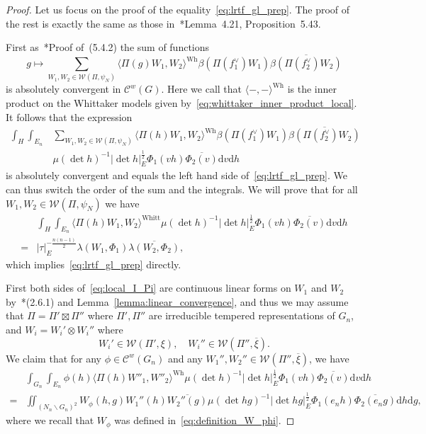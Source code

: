 \documentclass[letterpaper,11pt]{amsart}
\newcommand{\cC}{\mathcal{C}}
\newcommand{\cW}{\mathcal{W}}
\newcommand{\rd}{\mathrm{d}}
\newcommand{\bs}{\backslash}
\newcommand{\<}{\negthickspace}
\providecommand{\abs}[1]{\lvert#1\rvert}
\theoremstyle{definition}
\theoremstyle{plain}
\theoremstyle{remark}
\numberwithin{equation}{section}
\begin{document}
\begin{proof}
Let us focus on the proof of the equality~\eqref{eq:lrtf_gl_prep}. The proof
of the rest is exactly the same as those in~\cite{BP1}*{Lemma~4.21,
Proposition~5.43}.

First as~\cite{BP1}*{Proof of~(5.4.2)} the sum of functions
    \[
    g \mapsto \sum_{W_1, W_2 \in \cW(\Pi, \psi_{N})}
    \langle \Pi(g) W_1, W_2 \rangle^{\mathrm{Wh}}
    \beta(\Pi(f_1^\vee) W_1) \overline{\beta(\Pi(f_2^\vee) W_2)}
    \]
is absolutely convergent in $\cC^w(G)$. Here we call that $\langle-, -\rangle^{\mathrm{Wh}}$ is the inner product on the Whittaker models given by~\eqref{eq:whittaker_inner_product_local}. It follows that the expression
    \[
    \begin{aligned}
    \int_{H} \int_{E_n}
    &\sum_{W_1, W_2 \in \cW(\Pi, \psi_{N})}
    \langle \Pi(h) W_1, W_2 \rangle^{\mathrm{Wh}}
    \beta(\Pi(f_1^\vee) W_1) \overline{\beta(\Pi(f_2^\vee) W_2)}\\
    &\mu(\det h)^{-1} \abs{\det h}_E^{\frac{1}{2}}
    \Phi_1(vh) \overline{\Phi_2(v)} \rd v \rd h
    \end{aligned}
    \]
is absolutely convergent and equals the left hand side
of~\eqref{eq:lrtf_gl_prep}. We can thus switch the order of the sum and the
integrals. We will prove that for all $W_1, W_2 \in \cW(\Pi, \psi_{N})$ we
have
    \begin{equation}    \label{eq:local_I_Pi}
    \begin{aligned}
    &\int_{H} \int_{E_n}
    \langle \Pi(h) W_1, W_2 \rangle^{\mathrm{Whitt}}
    \mu(\det h)^{-1} \abs{\det h}_E^{\frac{1}{2}}
    \Phi_1(vh) \overline{\Phi_2(v)} \rd v \rd h\\
    =
    &\abs{\tau}_E^{-\frac{n(n-1)}{2}}
    \lambda(W_1, \Phi_1) \overline{\lambda(W_2, \Phi_2)},
    \end{aligned}
    \end{equation}
which implies~\eqref{eq:lrtf_gl_prep} directly.

First both sides of~\eqref{eq:local_I_Pi} are continuous linear forms on
$W_1$ and $W_2$ by~\cite{BP1}*{(2.6.1)} and
Lemma~\ref{lemma:linear_convergence}, and thus we may assume that $\Pi = \Pi'
\boxtimes \Pi''$ where $\Pi', \Pi''$ are irreducible tempered representations
of $G_n$, and $W_i = W_i' \otimes W_i''$ where
    \[
    W_i' \in \cW(\Pi', \xi), \quad W_i'' \in \cW(\Pi'', \overline{\xi}).
    \]
We claim that for any $\phi \in \cC^w(G_n)$ and any $W_1'', W_2'' \in
\cW(\Pi'', \overline{\xi})$, we have
    \begin{equation}    \label{eq:a_trick_for_convergence}
    \begin{aligned}
    &\int_{G_n} \int_{E_n}
    \phi(h)
    \langle \Pi(h)W''_1, W''_2 \rangle^{\mathrm{Wh}}
    \mu(\det h)^{-1} \abs{\det h}_E^{\frac{1}{2}}
    \Phi_1(vh) \overline{\Phi_2(v)} \rd v \rd h\\ =
    & \iint_{(N_n \bs G_n)^2} W_{\phi}(h, g)
    W_1''(h) \overline{W_2''(g)}
    \mu(\det hg)^{-1} \abs{\det hg}_E^{\frac{1}{2}}
    \Phi_1(e_n h) \overline{\Phi_2(e_n g)} \rd h \rd g,
    \end{aligned}
    \end{equation}
where we recall that $W_\phi$ was defined in~\eqref{eq:definition_W_phi}.


\end{proof}
\end{document}
